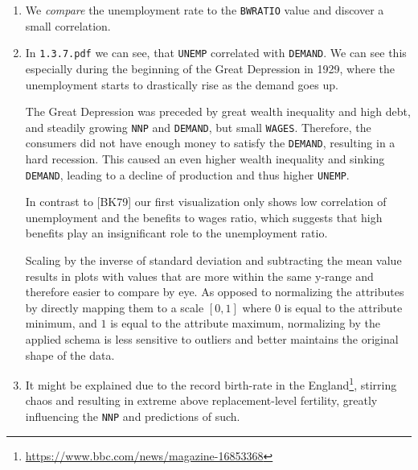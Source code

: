 \begin{exercise}
\begin{enumerate}
            \item We \emph{compare} the unemployment rate to the \lstinline|BWRATIO| value and discover a small correlation.
            \item[7. 8.] In \lstinline|1.3.7.pdf| we can see, that \lstinline|UNEMP| correlated with \lstinline|DEMAND|.
            We can see this especially during the beginning of the Great Depression in 1929, where the unemployment starts to drastically rise as the demand goes up.
            
            The Great Depression was preceded by great wealth inequality and high debt, and steadily growing \lstinline|NNP| and \lstinline|DEMAND|, but small \lstinline|WAGES|.
            Therefore, the consumers did not have enough money to satisfy the \lstinline|DEMAND|, resulting in a hard recession.
            This caused an even higher wealth inequality and sinking \lstinline|DEMAND|, leading to a decline of production and thus higher \lstinline|UNEMP|.

            In contrast to [BK79] our first visualization only shows low correlation of unemployment and the benefits to wages ratio, which suggests that high benefits play an insignificant role to the unemployment ratio.
            
            Scaling by the inverse of standard deviation and subtracting the mean value results in plots with values that are more within the same y-range and therefore easier to compare by eye.
            As opposed to normalizing the attributes by directly mapping them to a scale \([0,1]\) where \(0\) is equal to the attribute minimum, and \(1\) is equal to the attribute maximum, normalizing by the applied schema is less sensitive to outliers and better maintains the original shape of the data.
            \setcounter{enumi}{8}

            \item It might be explained due to the record birth-rate in the England\footnote{\url{https://www.bbc.com/news/magazine-16853368}}, stirring chaos and resulting in extreme above replacement-level fertility, greatly influencing the \lstinline|NNP| and predictions of such.
        \end{enumerate}
    \end{exercise}

